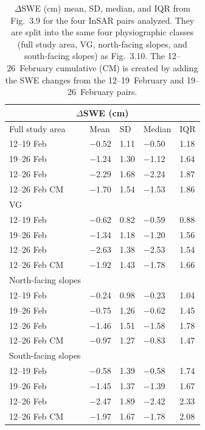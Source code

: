 \begin{table}[t]
\centering
\caption{$\Delta$SWE (cm) mean, SD, median, and IQR from Fig.~3.9 for the four InSAR pairs analyzed. They are split into the same four physiographic classes (full study area, VG, north-facing slopes, and south-facing slopes) as Fig.~3.10. The 12--26~February cumulative (CM) is created by adding the SWE changes from the 12--19~February and 19--26~February pairs.}
\begin{tabular}{lllll}
\toprule
\multicolumn{5}{c}{$\Delta$SWE (cm)} \\
\midrule
Full study area & Mean & SD & Median & IQR \\
\midrule
12--19 Feb & $-$0.52 & 1.11 & $-$0.50 & 1.18\\
19--26 Feb & $-$1.24 & 1.30 & $-$1.12 & 1.64\\
12--26 Feb & $-$2.29 & 1.68 & $-$2.24 & 1.87\\
12--26 Feb CM & $-$1.70 & 1.54 & $-$1.53 & 1.86\\
\midrule
VG \\
\midrule
12--19 Feb & $-$0.62 & 0.82 & $-$0.59 & 0.88\\
19--26 Feb & $-$1.34 & 1.18 & $-$1.20 & 1.56\\
12--26 Feb & $-$2.63 & 1.38 & $-$2.53 & 1.54\\
12--26 Feb CM & $-$1.92 & 1.43 & $-$1.78 & 1.66\\
\midrule
North-facing slopes \\
\midrule
12--19 Feb & $-$0.24 & 0.98 & $-$0.23 & 1.04\\
19--26 Feb & $-$0.75 & 1.26 & $-$0.62 & 1.45\\
12--26 Feb & $-$1.46 & 1.51 & $-$1.58 & 1.78\\
12--26 Feb CM & $-$0.97 & 1.27 & $-$0.83 & 1.47\\
\midrule
South-facing slopes \\
\midrule
12--19 Feb & $-$0.58 & 1.39 & $-$0.58 & 1.74\\
19--26 Feb & $-$1.45 & 1.37 & $-$1.39 & 1.67\\
12--26 Feb & $-$2.47 & 1.89 & $-$2.42 & 2.33\\
12--26 Feb CM & $-$1.97 & 1.67 & $-$1.78 & 2.08\\
\bottomrule
\end{tabular}
\end{table}

